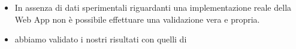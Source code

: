 \begin{frame}{\subsecname}
    \begin{itemize}
        \item In assenza di dati sperimentali riguardanti una implementazione reale della Web App non è possibile effettuare una validazione vera e propria.
        \item abbiamo validato i nostri risultati con quelli di \citet{DBLP:books/sp/Serazzi24}
    \end{itemize}
\end{frame}